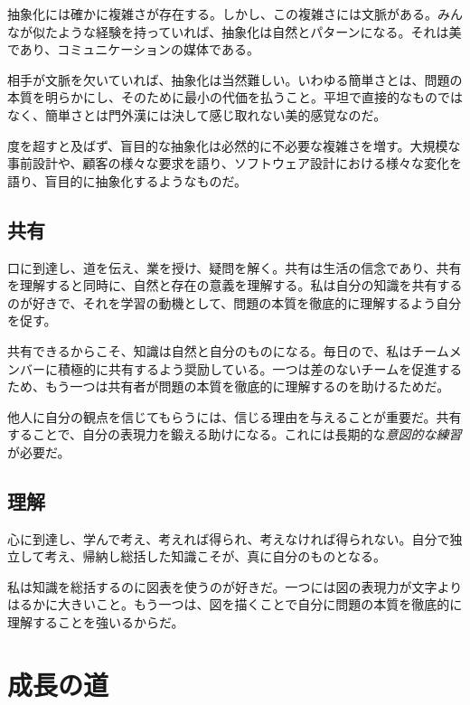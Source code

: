 \begin{content}
抽象化には確かに複雑さが存在する。しかし、この複雑さには文脈がある。みんなが似たような経験を持っていれば、抽象化は自然とパターンになる。それは美であり、コミュニケーションの媒体である。

相手が文脈を欠いていれば、抽象化は当然難しい。いわゆる簡単さとは、問題の本質を明らかにし、そのために最小の代価を払うこと。平坦で直接的なものではなく、簡単さとは門外漢には決して感じ取れない美的感覚なのだ。

度を超すと及ばず、盲目的な抽象化は必然的に不必要な複雑さを増す。大規模な事前設計や、顧客の様々な要求を語り、ソフトウェア設計における様々な変化を語り、盲目的に抽象化するようなものだ。

\subsection{共有}

口に到達し、道を伝え、業を授け、疑問を解く。共有は生活の信念であり、共有を理解すると同時に、自然と存在の意義を理解する。私は自分の知識を共有するのが好きで、それを学習の動機として、問題の本質を徹底的に理解するよう自分を促す。

共有できるからこそ、知識は自然と自分のものになる。毎日ので、私はチームメンバーに積極的に共有するよう奨励している。一つは差のないチームを促進するため、もう一つは共有者が問題の本質を徹底的に理解するのを助けるためだ。

他人に自分の観点を信じてもらうには、信じる理由を与えることが重要だ。共有することで、自分の表現力を鍛える助けになる。これには長期的な\emph{意図的な練習}が必要だ。

\subsection{理解}

心に到達し、学んで考え、考えれば得られ、考えなければ得られない。自分で独立して考え、帰納し総括した知識こそが、真に自分のものとなる。

私は知識を総括するのに図表を使うのが好きだ。一つには図の表現力が文字よりはるかに大きいこと。もう一つは、図を描くことで自分に問題の本質を徹底的に理解することを強いるからだ。

\end{content}

\section{成長の道}

